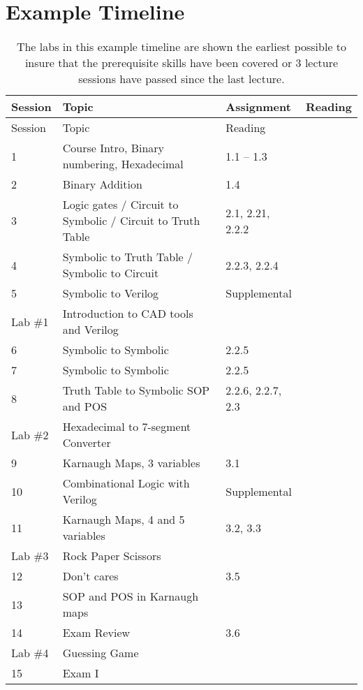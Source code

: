 \section{Example Timeline}

\begin{longtable}{|l|m{7cm}|l|l|}
\caption{The labs in this example timeline are shown the earliest possible
to insure that the prerequisite skills have been covered or 3 lecture sessions
have passed since the last lecture.}
\label{table:introTimeline}\tabularnewline
\toprule()
Session  & Topic & Assignment & Reading \\
\bottomrule()
\endfirsthead
\toprule()
Session  & Topic & Reading \\
\endhead
1			&  Course Intro, Binary numbering, Hexadecimal & 1.1 -- 1.3 \\ \hline
2			& Binary Addition & 1.4 \\ \hline
3			& Logic gates / Circuit to Symbolic / Circuit to Truth Table & 2.1, 2.21, 2.2.2 \\ \hline
4			& Symbolic to Truth Table / Symbolic to Circuit &  2.2.3, 2.2.4 \\ \hline
5 			& Symbolic to Verilog & Supplemental \\ \hline
 \rowcolor{yellow} 
Lab \#1	& Introduction to CAD tools and Verilog & \\ \hline
6 			& Symbolic to Symbolic &  2.2.5 \\ \hline
7 			& Symbolic to Symbolic &  2.2.5 \\ \hline
8 			& Truth Table to Symbolic SOP and POS  & 2.2.6, 2.2.7, 2.3 \\ \hline
 \rowcolor{yellow} 
Lab \#2 	& Hexadecimal to 7-segment Converter &  \\ \hline
9 			& Karnaugh Maps, 3 variables &  3.1 \\ \hline
10			&  Combinational Logic with Verilog &  Supplemental \\ \hline
11 			& Karnaugh Maps, 4 and 5 variables &  3.2, 3.3 \\ \hline
 \rowcolor{yellow} 
Lab \#3	& Rock Paper Scissors & \\ \hline
12 			& Don't cares &  3.5 \\ \hline
13			& SOP and POS in Karnaugh maps  & \\ \hline
14 			& Exam Review  & 3.6 \\ \hline
 \rowcolor{yellow} 
Lab \#4 	& Guessing Game & \\ \hline
15			& Exam I &  \\ \hline

\end{longtable}
